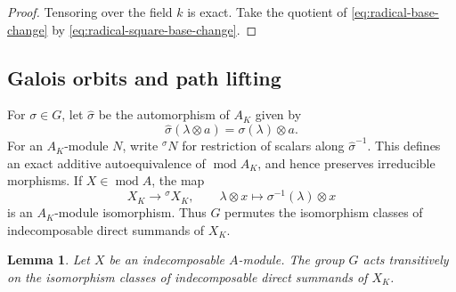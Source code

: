 \documentclass[11pt,letterpaper,reqno]{amsart}
\newtheorem{lemma}[lemma]{Lemma}
\theoremstyle{definition}
\newcommand{\modcat}{\operatorname{mod}}
\begin{document}
\begin{proof}
Tensoring over the field $k$ is exact.  Take the quotient of
\eqref{eq:radical-base-change} by
\eqref{eq:radical-square-base-change}.
\end{proof}

\subsection{Galois orbits and path lifting}\label{subsec:path-lifting}

For $\sigma\in G$, let $\widehat\sigma$ be the automorphism of $A_K$ given
by
\[
\widehat\sigma(\lambda\otimes a)=\sigma(\lambda)\otimes a.
\]
For an $A_K$-module $N$, write ${}^\sigma N$ for restriction of scalars
along $\widehat\sigma^{-1}$.  This defines an exact additive
autoequivalence of $\modcat A_K$, and hence preserves irreducible morphisms.
If $X\in\modcat A$, the map
\begin{equation}\label{eq:extended-module-twist-isomorphism}
X_K\longrightarrow{}^\sigma X_K,
\qquad
\lambda\otimes x\longmapsto\sigma^{-1}(\lambda)\otimes x
\end{equation}
is an $A_K$-module isomorphism.  Thus $G$ permutes the isomorphism classes
of indecomposable direct summands of $X_K$.

\begin{lemma}\label{lem:galois-transitivity}
Let $X$ be an indecomposable $A$-module.  The group $G$ acts transitively on
the isomorphism classes of indecomposable direct summands of $X_K$.
\end{lemma}
\end{document}
